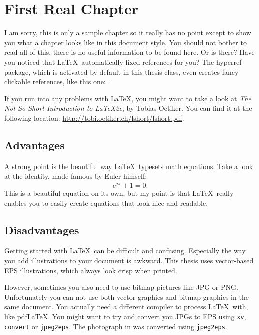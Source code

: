 \chapter{First Real Chapter} \label{sample chapter}

I am sorry, this is only a sample chapter so it really has no point except to show you what a chapter looks like in this document style. You should not bother to read all of this, there is no useful information to be found here. Or is there? Have you noticed that \LaTeX\ automatically fixed references for you? The hyperref package, which is activated by default in this thesis class, even creates fancy clickable references, like this one: .

If you run into any problems with \LaTeX, you might want to take a look at \textit{The Not So Short Introduction to \LaTeX2e}, by Tobias Oetiker. You can find it at the following location: \url{http://tobi.oetiker.ch/lshort/lshort.pdf}.

\section{Advantages}

A strong point is the beautiful way \LaTeX\ typesets math equations. Take a look at the identity, made famous by Euler himself:
\begin{equation}
e^{j\pi} + 1 = 0.
\end{equation}
This is a beautiful equation on its own, but my point is that \LaTeX\ really enables you to easily create equations that look nice and readable.

\section{Disadvantages}

Getting started with \LaTeX\ can be difficult and confusing. Especially the way you add illustrations to your document is awkward. This thesis uses vector-based EPS illustrations, which always look crisp when printed.

However, sometimes you also need to use bitmap pictures like JPG or PNG. Unfortunately you can not use both vector graphics and bitmap graphics in the same document. You actually need a different compiler to process \LaTeX\ with, like pdf\LaTeX. You might want to try and convert you JPGs to EPS using \texttt{xv}, \texttt{convert} or \texttt{jpeg2eps}. The photograph in  was converted using \texttt{jpeg2eps}.

